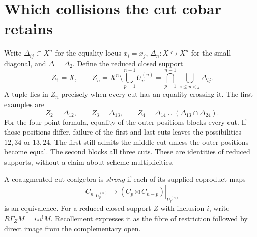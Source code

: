 \section{Which collisions the cut cobar retains}
\label{cycuts:sec:support}

Write $\Delta_{ij}\subset X^n$ for the equality locus $x_i=x_j$,
$\Delta_n:X\hookrightarrow X^n$ for the small diagonal, and
$\Delta=\Delta_2$. Define the reduced closed support
\begin{equation}\label{cycuts:eq:Z}
 Z_1=X,\qquad
 Z_n=X^n\setminus\bigcup_{p=1}^{n-1}U_p^{(n)}
     =\bigcap_{p=1}^{n-1}\ \bigcup_{i\le p<j}\Delta_{ij}.
\end{equation}
A tuple lies in $Z_n$ precisely when every cut has an equality
crossing it. The first examples are
\begin{equation}\label{cycuts:eq:small-Z}
 Z_2=\Delta_{12},\qquad Z_3=\Delta_{13},\qquad
 Z_4=\Delta_{14}\cup(\Delta_{13}\cap\Delta_{24}).
\end{equation}
For the four-point formula, equality of the outer positions blocks
every cut. If those positions differ, failure of the first and last
cuts leaves the possibilities $12,34$ or $13,24$. The first still
admits the middle cut unless the outer positions become equal.
The second blocks all three cuts. These are identities of reduced
supports, without a claim about scheme multiplicities.

A coaugmented cut coalgebra is \emph{strong} if each of its supplied
coproduct maps
\[
 C_n|_{U_p^{(n)}}\longrightarrow
       (C_p\boxtimes C_{n-p})|_{U_p^{(n)}}
\]
is an equivalence. For a reduced closed support $Z$ with inclusion $i$,
write $R\Gamma_ZM=i_*i^!M$. Recollement expresses it as the fibre
of restriction followed by direct image from the complementary open.

